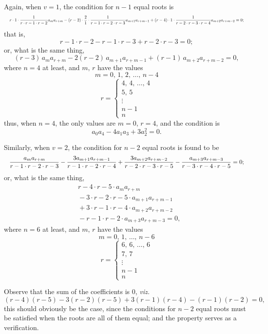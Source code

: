 \documentclass[11pt]{article}
\begin{document}
\medskip
Again, when $v = 1$, the condition for $n - 1$ equal roots is
\[
  \resizebox{\textwidth}{!}{$\displaystyle
  r \cdot 1 \cdot \frac{1}{r \cdot r - 1 \cdot r - 2} a_{m} a_{r+m}
  - (r - 2) \cdot \frac{2}{1} \cdot \frac{1}{r - 1 \cdot r - 2 \cdot r - 3} a_{m+1} a_{r+m-1}
  + (r - 4) \cdot 1 \cdot \frac{1}{r - 2 \cdot r - 3 \cdot r - 4} a_{m+2} a_{r+m-2} = 0;
  $}
\]
that is,
\[
  r - 1 \cdot r - 2 - r - 1 \cdot r - 3 + r - 2 \cdot r - 3 = 0;
\]
or, what is the same thing,
\[
  (r - 3)\,a_{m} a_{r+m} - 2(r - 2)\,a_{m+1} a_{r+m-1} + (r - 1)\,a_{m+2} a_{r+m-2} = 0,
\]
where $n = 4$ at least, and $m,\,r$ have the values
\[
  m = 0,\,1,\,2,\,\ldots,\,n - 4
\]
\[
  r = \begin{cases} 4,\,4,\,\ldots,\,4\\ 5,\,5\\ \vdots\\ n - 1\\ n\end{cases}
\]
thus, when $n = 4$, the only values are $m = 0$, $r = 4$, and the condition is
\[
  a_{0} a_{4} - 4 a_{1} a_{3} + 3 a_{2}^{2} = 0.
\]

Similarly, when $v = 2$, the condition for $n - 2$ equal roots is found to be
\[
  \resizebox{\textwidth}{!}{$\displaystyle
  \frac{a_{m} a_{r+m}}{r - 1 \cdot r - 2 \cdot r - 3}
  - \frac{3 a_{m+1} a_{r+m-1}}{r - 1 \cdot r - 2 \cdot r - 4}
  + \frac{3 a_{m+2} a_{r+m-2}}{r - 2 \cdot r - 3 \cdot r - 5}
  - \frac{a_{m+3} a_{r+m-3}}{r - 3 \cdot r - 4 \cdot r - 5} = 0;
  $}
\]
or, what is the same thing,
\begin{align*}
  & r - 4 \cdot r - 5 \cdot a_{m} a_{r+m}\\
  & {} - 3 \cdot r - 2 \cdot r - 5 \cdot a_{m+1} a_{r+m-1}\\
  & {} + 3 \cdot r - 1 \cdot r - 4 \cdot a_{m+2} a_{r+m-2}\\
  & {} - r - 1 \cdot r - 2 \cdot a_{m+3} a_{r+m-3} = 0,
\end{align*}
where $n = 6$ at least, and $m,\,r$ have the values
\[
  m = 0,\,1,\,\ldots,\,n - 6
\]
\[
  r = \begin{cases} 6,\,6,\,\ldots,\,6\\ 7,\,7\\ \vdots\\ n - 1\\ n\end{cases}
\]

Observe that the sum of the coefficients is $0$, \emph{viz.}
\[
  (r - 4)(r - 5) - 3(r - 2)(r - 5) + 3(r - 1)(r - 4) - (r - 1)(r - 2) = 0,
\]
this should obviously be the case, since the conditions for $n - 2$ equal roots must
be satisfied when the roots are all of them equal; and the property serves as a
verification.
\end{document}
